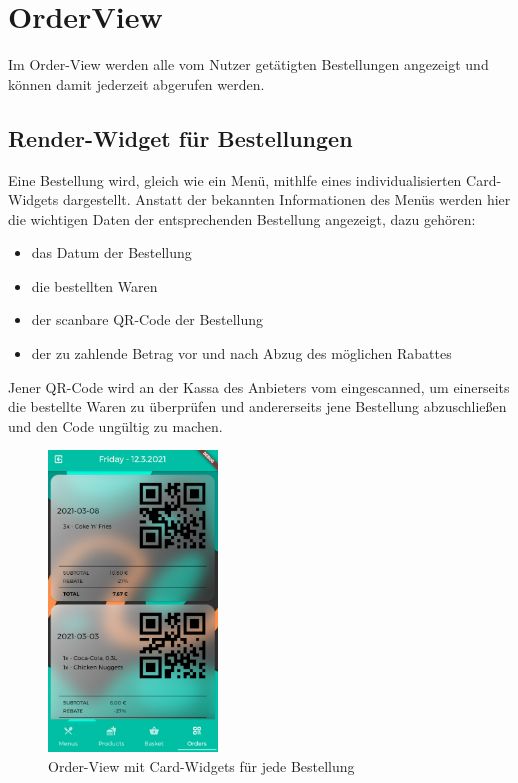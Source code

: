 \section{OrderView}

Im Order-View werden alle vom Nutzer getätigten Bestellungen angezeigt und können damit
jederzeit abgerufen werden.

\subsection{Render-Widget für Bestellungen}

Eine Bestellung wird, gleich wie ein Menü, mithlfe eines individualisierten Card-Widgets
dargestellt.
Anstatt der bekannten Informationen des Menüs werden hier die wichtigen Daten der entsprechenden
Bestellung angezeigt, dazu gehören:

\begin{itemize}
    \item das Datum der Bestellung
    \item die bestellten Waren
    \item der scanbare QR-Code der Bestellung
    \item der zu zahlende Betrag vor und nach Abzug des möglichen Rabattes
\end{itemize}

Jener QR-Code wird an der Kassa des Anbieters vom  eingescanned, um einerseits
die bestellte Waren zu überprüfen und andererseits jene Bestellung abzuschließen und den Code
ungültig zu machen.

\begin{figure}[H]
    \centering
    \includegraphics[width=0.40\textwidth]{images/Client/views/orderview/orderview.png}
    \caption{Order-View mit Card-Widgets für jede Bestellung}
\end{figure}

